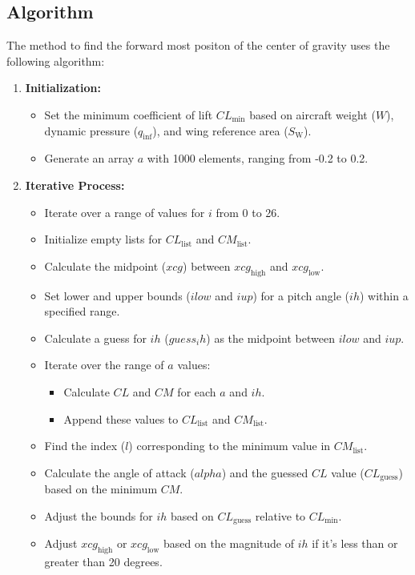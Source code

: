 \documentclass[a4paper, twoside]{article}
\begin{document}
\subsection{Algorithm}
The method to find the forward most positon of the center of gravity uses the following algorithm: \\
\begin{enumerate}
    \item \textbf{Initialization:}
        \begin{itemize}
            \item Set the minimum coefficient of lift $CL_{\text{min}}$ based on aircraft weight ($W$), dynamic pressure ($q_{\text{inf}}$), and wing reference area ($S_{\text{W}}$).
            \item Generate an array $a$ with 1000 elements, ranging from -0.2 to 0.2.
        \end{itemize}
        
    \item \textbf{Iterative Process:}
        \begin{itemize}
            \item Iterate over a range of values for $i$ from 0 to 26.
            \item Initialize empty lists for $CL_{\text{list}}$ and $CM_{\text{list}}$.
            \item Calculate the midpoint ($xcg$) between $xcg_{\text{high}}$ and $xcg_{\text{low}}$.
            \item Set lower and upper bounds ($ilow$ and $iup$) for a pitch angle ($ih$) within a specified range.
            \item Calculate a guess for $ih$ ($guess_ih$) as the midpoint between $ilow$ and $iup$.
            \item Iterate over the range of $a$ values:
                \begin{itemize}
                    \item Calculate $CL$ and $CM$ for each $a$ and $ih$.
                    \item Append these values to $CL_{\text{list}}$ and $CM_{\text{list}}$.
                \end{itemize}
            \item Find the index ($l$) corresponding to the minimum value in $CM_{\text{list}}$.
            \item Calculate the angle of attack ($alpha$) and the guessed $CL$ value ($CL_{\text{guess}}$) based on the minimum $CM$.
            \item Adjust the bounds for $ih$ based on $CL_{\text{guess}}$ relative to $CL_{\text{min}}$.
            \item Adjust $xcg_{\text{high}}$ or $xcg_{\text{low}}$ based on the magnitude of $ih$ if it's less than or greater than 20 degrees.
        \end{itemize}
\end{enumerate}
\pagebreak
\end{document}
